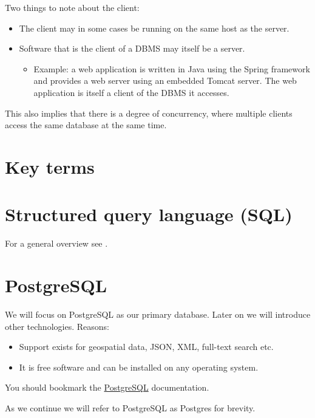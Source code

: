 \documentclass{pgnotes}
\begin{document}
Two things to note about the client:
\begin{itemize}
\item The client may in some cases be running on the same host as the server.
\item Software that is the client of a DBMS may itself be a server.
  \begin{itemize}
  \item Example: a web application is written in Java using the Spring framework and provides a web server using an embedded Tomcat server. The web application is itself a client of the DBMS it accesses.
  \end{itemize}
\end{itemize}

This also implies that there is a degree of concurrency, where multiple clients access the same database at the same time.


\section{Key terms}




\section{Structured query language (SQL)}
\label{sec:sql}

For a general overview see \citep{chamberlain:2012:early}.


\section{PostgreSQL}
\label{sec:postgresql}

We will focus on PostgreSQL as our primary database.
Later on we will introduce other technologies. 
Reasons:
\begin{itemize}
\item Support exists for geospatial data, JSON, XML, full-text search etc.
\item It is free software and can be installed on any operating system.
\end{itemize}
You should bookmark the \href{https://www.postgresql.org/docs/13/}{PostgreSQL} documentation.

As we continue we will refer to PostgreSQL as Postgres for brevity.
\end{document}
